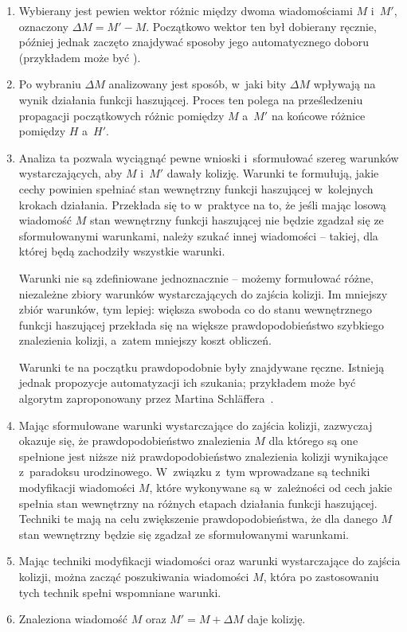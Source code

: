 \begin{enumerate}

\item Wybierany jest pewien wektor różnic między dwoma wiadomościami $M$
i~$M'$, oznaczony $\Delta M = M' - M$. Początkowo wektor ten był dobierany
ręcznie, później jednak zaczęto znajdywać sposoby jego automatycznego
doboru (przykładem może być \cite{sha1_disturbance_vector}).

\item Po wybraniu $\Delta M$ analizowany jest sposób, w~jaki bity $\Delta M$
wpływają na wynik działania funkcji haszującej. Proces ten polega na
prześledzeniu propagacji początkowych różnic pomiędzy $M$ a~$M'$ na końcowe
różnice pomiędzy $H$ a~$H'$.

\item Analiza ta pozwala wyciągnąć pewne wnioski i~sformułować szereg warunków
wystarczających, aby $M$ i~$M'$ dawały kolizję. Warunki te formułują, jakie
cechy powinien spełniać stan wewnętrzny funkcji haszującej w~kolejnych krokach
działania. Przekłada się to w~praktyce na to, że jeśli mając losową
wiadomość $M$ stan wewnętrzny funkcji haszującej nie będzie zgadzał się ze
sformułowanymi warunkami, należy szukać innej wiadomości -- takiej, dla której
będą zachodziły wszystkie warunki.

Warunki nie są zdefiniowane jednoznacznie -- możemy formułować różne,
niezależne zbiory warunków wystarczających do zajścia kolizji. Im mniejszy
zbiór warunków, tym lepiej: większa swoboda co do stanu wewnętrznego funkcji
haszującej przekłada się na większe prawdopodobieństwo szybkiego znalezienia
kolizji, a~zatem mniejszy koszt obliczeń.

Warunki te na początku prawdopodobnie były znajdywane ręczne. Istnieją jednak
propozycje automatyzacji ich szukania; przykładem może być algorytm
zaproponowany przez Martina Schl{\"a}ffera~\cite{md4_differential_paths}.

\item Mając sformułowane warunki wystarczające do zajścia kolizji, zazwyczaj
okazuje się, że prawdopodobieństwo znalezienia $M$ dla którego są one spełnione
jest niższe niż prawdopodobieństwo znalezienia kolizji wynikające z~paradoksu
urodzinowego. W~związku z~tym wprowadzane są techniki modyfikacji wiadomości
$M$, które wykonywane są w~zależności od cech jakie spełnia stan wewnętrzny na
różnych etapach działania funkcji haszującej. Techniki te mają na celu
zwiększenie prawdopodobieństwa, że dla danego $M$ stan wewnętrzny będzie się
zgadzał ze sformułowanymi warunkami.

\item Mając techniki modyfikacji wiadomości oraz warunki wystarczające do
zajścia kolizji, można zacząć poszukiwania wiadomości $M$, która po
zastosowaniu tych technik spełni wspomniane warunki.

\item Znaleziona wiadomość $M$ oraz $M' = M +\Delta M$ daje kolizję.

\end{enumerate}

